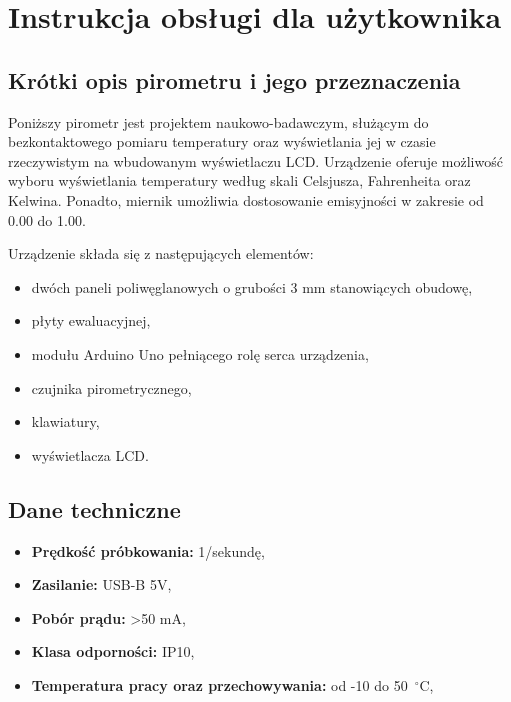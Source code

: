 \chapter{Instrukcja obsługi dla użytkownika}
\section*{Krótki opis pirometru i jego przeznaczenia}

Poniższy pirometr jest projektem naukowo-badawczym, służącym do bezkontaktowego pomiaru temperatury oraz wyświetlania jej w czasie rzeczywistym na wbudowanym wyświetlaczu LCD. Urządzenie oferuje możliwość wyboru wyświetlania temperatury według skali Celsjusza, Fahrenheita oraz Kelwina. Ponadto, miernik umożliwia dostosowanie emisyjności w zakresie od 0.00 do 1.00.

\vspace{12pt}

Urządzenie składa się z następujących elementów:
\begin{itemize}
    \item dwóch paneli poliwęglanowych o grubości 3 mm stanowiących obudowę,
    \item płyty ewaluacyjnej,
    \item modułu Arduino Uno pełniącego rolę serca urządzenia,
    \item czujnika pirometrycznego,
    \item klawiatury,
    \item wyświetlacza LCD.
\end{itemize}

\section*{Dane techniczne}
\begin{itemize}
    \item \textbf{Prędkość próbkowania:} 1/sekundę,
    \item \textbf{Zasilanie:} USB-B 5V,
    \item \textbf{Pobór prądu:} >50 mA,
    \item \textbf{Klasa odporności:} IP10,
    \item \textbf{Temperatura pracy oraz przechowywania:} od -10 do 50~$^{\circ}$C,
\end{itemize}

